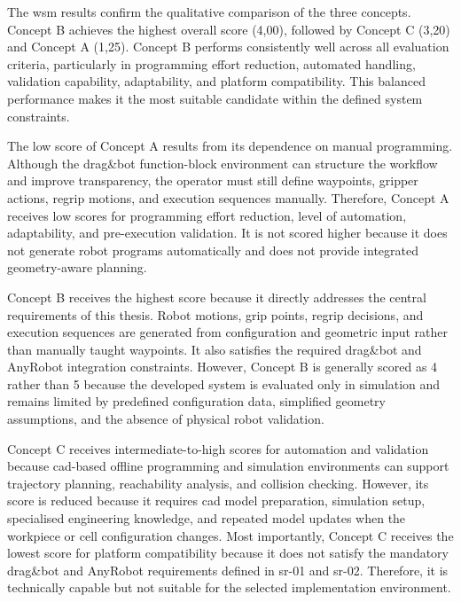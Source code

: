 \label{sec:analysis-concept-decision}

The \ac{wsm} results confirm the qualitative comparison of the three concepts. Concept B achieves the highest overall score (4,00), followed by Concept C (3,20) and Concept A (1,25). Concept B performs consistently well across all evaluation criteria, particularly in programming effort reduction, automated handling, validation capability, adaptability, and platform compatibility. This balanced performance makes it the most suitable candidate within the defined system constraints.

The low score of Concept A results from its dependence on manual programming. Although the drag\&bot function-block environment can structure the workflow and improve transparency, the operator must still define waypoints, gripper actions, regrip motions, and execution sequences manually. Therefore, Concept A receives low scores for programming effort reduction, level of automation, adaptability, and pre-execution validation. It is not scored higher because it does not generate robot programs automatically and does not provide integrated geometry-aware planning.

Concept B receives the highest score because it directly addresses the central requirements of this thesis. Robot motions, grip points, regrip decisions, and execution sequences are generated from configuration and geometric input rather than manually taught waypoints. It also satisfies the required drag\&bot and AnyRobot integration constraints. However, Concept B is generally scored as 4 rather than 5 because the developed system is evaluated only in simulation and remains limited by predefined configuration data, simplified geometry assumptions, and the absence of physical robot validation.

Concept C receives intermediate-to-high scores for automation and validation because \acs{cad}-based offline programming and simulation environments can support trajectory planning, reachability analysis, and collision checking. However, its score is reduced because it requires \acs{cad} model preparation, simulation setup, specialised engineering knowledge, and repeated model updates when the workpiece or cell configuration changes. Most importantly, Concept C receives the lowest score for platform compatibility because it does not satisfy the mandatory drag\&bot and AnyRobot requirements defined in \acs{sr}-01 and \acs{sr}-02. Therefore, it is technically capable but not suitable for the selected implementation environment.

